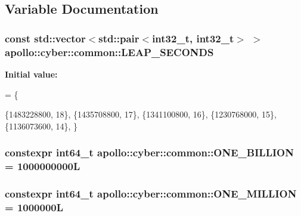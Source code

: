 \subsection{Variable Documentation}
\hypertarget{namespaceapollo_1_1cyber_1_1common_a48c0d45777e43c24f3d4f9e3f083e913}{
\subsubsection[{L\-E\-A\-P\-\_\-\-S\-E\-C\-O\-N\-D\-S}]{\setlength{\rightskip}{0pt plus 5cm}const std\-::vector$<$std\-::pair$<$int32\-\_\-t, int32\-\_\-t$>$ $>$ apollo\-::cyber\-::common\-::\-L\-E\-A\-P\-\_\-\-S\-E\-C\-O\-N\-D\-S\hspace{0.3cm}{\ttfamily [static]}}}\label{namespaceapollo_1_1cyber_1_1common_a48c0d45777e43c24f3d4f9e3f083e913}
{\bfseries Initial value\-:}
\begin{DoxyCode}
= \{
    
    
    \{1483228800, 18\},  
    \{1435708800, 17\},  
    \{1341100800, 16\},  
    \{1230768000, 15\},  
    \{1136073600, 14\},  
\}
\end{DoxyCode}
\hypertarget{namespaceapollo_1_1cyber_1_1common_a907a999b5e563a182644d11496beb6fe}{
\subsubsection[{O\-N\-E\-\_\-\-B\-I\-L\-L\-I\-O\-N}]{\setlength{\rightskip}{0pt plus 5cm}constexpr int64\-\_\-t apollo\-::cyber\-::common\-::\-O\-N\-E\-\_\-\-B\-I\-L\-L\-I\-O\-N = 1000000000\-L}}\label{namespaceapollo_1_1cyber_1_1common_a907a999b5e563a182644d11496beb6fe}
\hypertarget{namespaceapollo_1_1cyber_1_1common_a3e61850fe7f6e4161edd0407d2905b1e}{
\subsubsection[{O\-N\-E\-\_\-\-M\-I\-L\-L\-I\-O\-N}]{\setlength{\rightskip}{0pt plus 5cm}constexpr int64\-\_\-t apollo\-::cyber\-::common\-::\-O\-N\-E\-\_\-\-M\-I\-L\-L\-I\-O\-N = 1000000\-L}}\label{namespaceapollo_1_1cyber_1_1common_a3e61850fe7f6e4161edd0407d2905b1e}

